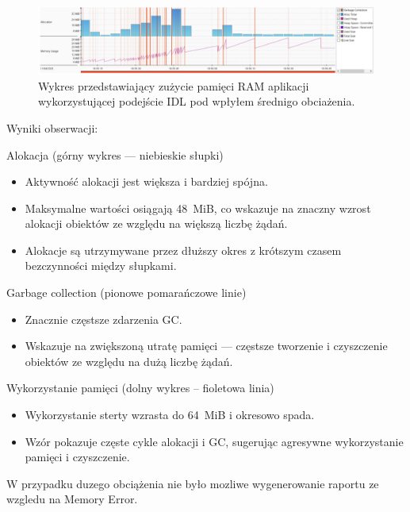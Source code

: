 \documentclass[runningheads,12pt]{llncs}
\begin{document}
\newpage

\begin{figure}
    \includegraphics[width=\linewidth]{images/idl-memory-low-graph.jpg}
    \caption{Wykres przedstawiający zużycie pamięci RAM aplikacji wykorzystującej podejście IDL pod wpłyłem średnigo obciażenia.} \label{fig1}
\end{figure}

Wyniki obserwacji:

Alokacja (górny wykres — niebieskie słupki)

\begin{itemize}
  \item Aktywność alokacji jest większa i bardziej spójna.
  \item Maksymalne wartości osiągają 48~MiB, co wskazuje na znaczny wzrost alokacji obiektów ze względu na większą liczbę żądań.
  \item Alokacje są utrzymywane przez dłuższy okres z krótszym czasem bezczynności między słupkami.
\end{itemize}

Garbage collection (pionowe pomarańczowe linie)

\begin{itemize}
  \item Znacznie częstsze zdarzenia GC.
  \item Wskazuje na zwiększoną utratę pamięci — częstsze tworzenie i czyszczenie obiektów ze względu na dużą liczbę żądań.
\end{itemize}

Wykorzystanie pamięci (dolny wykres – fioletowa linia)

\begin{itemize}
  \item Wykorzystanie sterty wzrasta do 64~MiB i okresowo spada.
  \item Wzór pokazuje częste cykle alokacji i GC, sugerując agresywne wykorzystanie pamięci i czyszczenie.
\end{itemize}

W przypadku duzego obciążenia nie było mozliwe wygenerowanie raportu ze wzgledu na Memory Error.

\newpage

\end{document}
